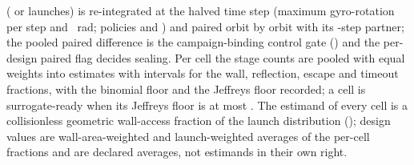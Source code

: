(\WlhControlOfStageOne{} or \WlhControlOfTopped{} launches) is re-integrated at the
halved time step (maximum gyro-rotation per step \WlhRotationN{} and
\WlhRotationTwoN~rad; policies \texttt{\WlhTimestepN} and \texttt{\WlhTimestepControl}) and
paired orbit by orbit with its \texttt{\WlhTimestepN}-step partner; the pooled paired
difference is the campaign-binding control gate (\WlhControlGateMax) and the
per-design paired flag decides sealing. Per cell the stage counts are pooled with
equal weights into \texttt{\WlhEstimator} estimates with \texttt{\WlhIntervalMethod}
intervals for the wall, reflection, escape and timeout fractions, with the binomial
floor and the Jeffreys floor recorded; a cell is surrogate-ready when its Jeffreys
floor is at most \WlhReadinessFloor. The estimand of every cell is a collisionless
geometric wall-access fraction of the launch distribution (\WlhEstimandStatement);
design values are wall-area-weighted and launch-weighted averages of the per-cell
fractions and are declared averages, not estimands in their own right.

